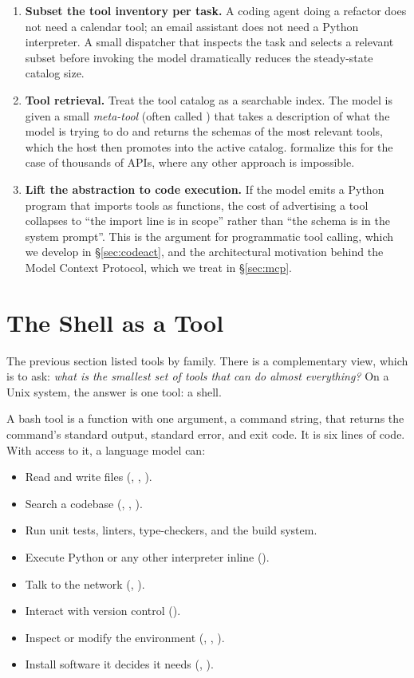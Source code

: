\begin{enumerate}[label=(\arabic*)]
\item \textbf{Subset the tool inventory per task.} A coding agent
  doing a refactor does not need a calendar tool; an email assistant
  does not need a Python interpreter. A small dispatcher that
  inspects the task and selects a relevant subset before invoking
  the model dramatically reduces the steady-state catalog size.
\item \textbf{Tool retrieval.} Treat the tool catalog as a
  searchable index. The model is given a small \emph{meta-tool}
  (often called ) that takes a description of what
  the model is trying to do and returns the schemas of the most
  relevant tools, which the host then promotes into the active
  catalog. \citet{patil2023gorilla} formalize this for the case of
  thousands of APIs, where any other approach is impossible.
\item \textbf{Lift the abstraction to code execution.} If the model
  emits a Python program that imports tools as functions, the cost
  of advertising a tool collapses to ``the import line is in scope''
  rather than ``the schema is in the system prompt''. This is the
  argument for programmatic tool calling, which we develop in
  \S\ref{sec:codeact}, and the architectural motivation behind the
  Model Context Protocol, which we treat in \S\ref{sec:mcp}.
\end{enumerate}

\section{The Shell as a Tool}
\label{sec:shell}

The previous section listed tools by family. There is a complementary
view, which is to ask: \emph{what is the smallest set of tools that
can do almost everything?} On a Unix system, the answer is one tool:
a shell.

A bash tool is a function with one argument, a command string, that
returns the command's standard output, standard error, and exit
code. It is six lines of code. With access to it, a language model
can:

\begin{itemize}[leftmargin=1.5em,topsep=0.2em,itemsep=0.1em]
\item Read and write files (, , ).
\item Search a codebase (, , ).
\item Run unit tests, linters, type-checkers, and the build system.
\item Execute Python or any other interpreter inline
  ().
\item Talk to the network (, ).
\item Interact with version control ().
\item Inspect or modify the environment (, ,
  ).
\item Install software it decides it needs (,
  ).
\end{itemize}

